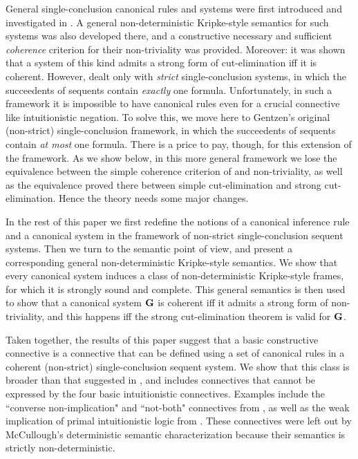 \documentclass{LMCS}
\theoremstyle{remark}
\begin{document}
General single-conclusion canonical rules and systems were first introduced 
and investigated in \cite{AL10}. 
A general non-deterministic Kripke-style semantics for such systems 
was also developed there, and a constructive necessary and
sufficient {\em coherence} criterion 
for their non-triviality was provided. Moreover: it was shown
that a system of this
kind admits a strong form of cut-elimination iff it is coherent. 
However, \cite{AL10} dealt only with {\em strict} single-conclusion systems,
in which the succeedents of sequents contain {\em exactly} one formula.
Unfortunately, in such a framework it is impossible to have canonical rules even 
for a crucial connective like intuitionistic  negation.
To solve this, we move here to Gentzen's original 
(non-strict) single-conclusion framework, 
in which the succeedents of sequents contain {\em at most} one formula. 
There is a price to pay, though, for this extension of the framework. 
As we show below, in this more general framework we lose
the equivalence between the simple coherence criterion
of \cite{AL05,AL10} and non-triviality,
as well as the equivalence proved there between simple cut-elimination and strong cut-elimination.
Hence the theory needs some major changes.



In the rest of this paper 
we first redefine the notions of a canonical inference rule and a canonical
system in the framework of non-strict single-conclusion sequent systems.
Then we turn to the semantic point of view, and 
present a corresponding general non-deterministic Kripke-style semantics.
We show that every canonical system 
induces a class of non-deterministic Kripke-style frames,
for which it is strongly sound and complete. 
This general semantics is then used  to show that a   canonical system
${\bf G}$ is coherent iff it admits a strong form of non-triviality, and this happens
iff the strong  cut-elimination theorem is valid for ${\bf G}$.



Taken together, the results of this paper suggest that a basic constructive connective
is a connective that can be defined using a set of canonical rules
in a coherent (non-strict) single-conclusion sequent system.
We show that this class is broader than that suggested in \cite{McCullough},
and includes connectives that cannot be expressed by the four basic intuitionistic connectives.
Examples include the 
``converse non-implication" and ``not-both" connectives from \cite{Bowen}, 
as well as the weak implication of primal intuitionistic logic from \cite{gu09}.
These connectives were left out by McCullough's deterministic semantic characterization
because their semantics is strictly non-deterministic.
\end{document}
